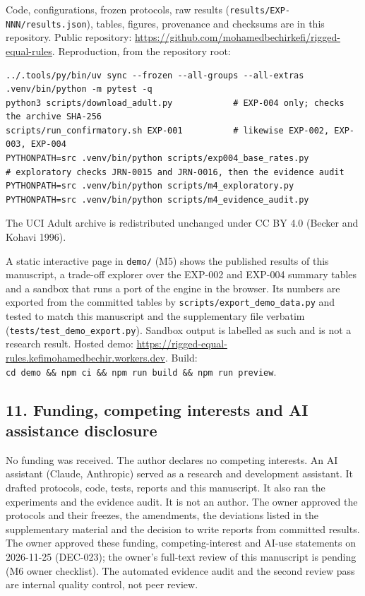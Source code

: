 \documentclass[
]{article}
\begin{document}
Code, configurations, frozen protocols, raw results
(\texttt{results/EXP-NNN/results.json}), tables, figures, provenance and
checksums are in this repository. Public repository:
\url{https://github.com/mohamedbechirkefi/rigged-equal-rules}.
Reproduction, from the repository root:

\begin{verbatim}
../.tools/py/bin/uv sync --frozen --all-groups --all-extras
.venv/bin/python -m pytest -q
python3 scripts/download_adult.py            # EXP-004 only; checks the archive SHA-256
scripts/run_confirmatory.sh EXP-001          # likewise EXP-002, EXP-003, EXP-004
PYTHONPATH=src .venv/bin/python scripts/exp004_base_rates.py
# exploratory checks JRN-0015 and JRN-0016, then the evidence audit
PYTHONPATH=src .venv/bin/python scripts/m4_exploratory.py
PYTHONPATH=src .venv/bin/python scripts/m4_evidence_audit.py
\end{verbatim}

The UCI Adult archive is redistributed unchanged under CC BY 4.0 (Becker
and Kohavi 1996).

A static interactive page in \texttt{demo/} (M5) shows the published
results of this manuscript, a trade-off explorer over the EXP-002 and
EXP-004 summary tables and a sandbox that runs a port of the engine in
the browser. Its numbers are exported from the committed tables by
\texttt{scripts/export\_demo\_data.py} and tested to match this
manuscript and the supplementary file verbatim
(\texttt{tests/test\_demo\_export.py}). Sandbox output is labelled as
such and is not a research result. Hosted demo:
\url{https://rigged-equal-rules.kefimohamedbechir.workers.dev}. Build:
\texttt{cd\ demo\ \&\&\ npm\ ci\ \&\&\ npm\ run\ build\ \&\&\ npm\ run\ preview}.

\subsection{11. Funding, competing interests and AI assistance
disclosure}\label{funding-competing-interests-and-ai-assistance-disclosure}

No funding was received. The author declares no competing interests. An
AI assistant (Claude, Anthropic) served as a research and development
assistant. It drafted protocols, code, tests, reports and this
manuscript. It also ran the experiments and the evidence audit. It is
not an author. The owner approved the protocols and their freezes, the
amendments, the deviations listed in the supplementary material and the
decision to write reports from committed results. The owner approved
these funding, competing-interest and AI-use statements on 2026-11-25
(DEC-023); the owner's full-text review of this manuscript is pending
(M6 owner checklist). The automated evidence audit and the second review
pass are internal quality control, not peer review.
\end{document}
